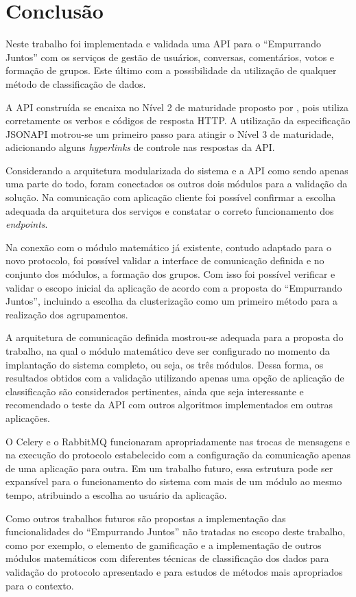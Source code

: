 \chapter{Conclusão} \label{cap:consideracoes_finais}

  Neste trabalho foi implementada e validada uma API para o ``Empurrando Juntos'' com os serviços de gestão de usuários, 
  conversas, comentários, votos e formação de grupos. 
  Este último com a possibilidade da utilização de qualquer método de classificação de dados.
  
  A API construída se encaixa no Nível 2 de maturidade proposto por ,
  pois utiliza corretamente os verbos e códigos de resposta HTTP.
  A utilização da especificação JSONAPI motrou-se um primeiro passo para atingir o Nível 3 de maturidade,
  adicionando alguns \textit{hyperlinks} de controle nas respostas da API.
  
  Considerando a arquitetura modularizada do sistema e a API como sendo apenas uma parte do todo, 
  foram conectados os outros dois módulos para a validação 
  da solução. Na comunicação com aplicação cliente foi possível confirmar a escolha adequada da arquitetura dos serviços e 
  constatar o correto funcionamento dos \textit{endpoints}.
  
  Na conexão com o módulo matemático já existente, contudo adaptado para o novo protocolo, foi possível validar a interface de 
  comunicação definida e no conjunto dos módulos, a formação dos grupos. Com isso foi possível verificar e validar o escopo 
  inicial da aplicação de acordo com a proposta do ``Empurrando Juntos'', incluindo a escolha da clusterização 
  como um primeiro método para a realização dos agrupamentos. 
  
  A arquitetura de comunicação definida mostrou-se adequada para a proposta do trabalho, na qual o módulo matemático 
  deve ser configurado no momento da implantação do sistema completo, ou seja, os três módulos. Dessa forma, os resultados obtidos
  com a validação utilizando apenas uma opção de aplicação de classificação são considerados pertinentes, ainda que seja interessante e recomendado
  o teste da API com outros algoritmos implementados em outras aplicações.
  
  O Celery e o RabbitMQ funcionaram apropriadamente nas trocas de mensagens e na execução do protocolo estabelecido com a configuração
  da comunicação apenas de uma aplicação para outra. Em um trabalho futuro, essa estrutura pode ser expansível para o funcionamento do sistema com mais 
  de um módulo ao mesmo tempo, atribuindo a escolha ao usuário da aplicação.
  
  Como outros trabalhos futuros são propostas a implementação das funcionalidades do ``Empurrando Juntos'' não tratadas no escopo deste trabalho,
  como por exemplo, o elemento de gamificação e a implementação de outros módulos matemáticos com diferentes técnicas
  de classificação dos dados para validação do protocolo apresentado e para estudos de métodos mais apropriados para o contexto.
  